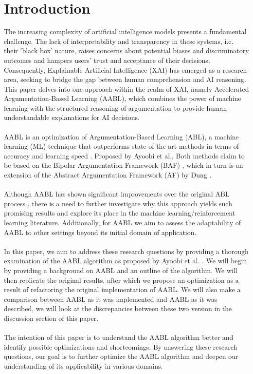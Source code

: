 \documentclass{article}
\begin{document}
\section{Introduction}
The increasing complexity of artificial intelligence models presents a fundamental challenge. The lack of interpretability and transparency in these systems, i.e. their  'black box' nature, raises concerns about potential biases and discriminatory outcomes and hampers users' trust and acceptance of their decisions. Consequently, Explainable Artificial Intelligence (XAI) has emerged as a research area, seeking to bridge the gap between human comprehension and AI reasoning. This paper delves into one approach within the realm of XAI, namely Accelerated Argumentation-Based Learning (AABL), which combines the power of machine learning with the structured reasoning of argumentation to provide human-understandable explanations for AI decisions.
\\\\
AABL is an optimization of Argumentation-Based Learning (ABL), a machine learning (ML) technique that  outperforms state-of-the-art methods in terms of accuracy and learning speed \cite{ayoobi2019handling, ayoobi2021online, valk2020comparing}. Proposed by Ayoobi et al.\cite{ayoobi2021argue}, Both methods claim to be based on the Bipolar Argumentation Framework (BAF) \cite{amgoud2008bipolarity}, which in turn is an extension of the Abstract Argumentation Framework (AF) by Dung \cite{dung1995acceptability}.
\\\\
Although AABL has shown significant improvements over the original ABL process \cite{ayoobi2019handling}, there is a need to further investigate why this approach yields such promising results and explore its place in the machine learning/reinforcement learning literature. Additionally, for AABL we aim to assess the adaptability of AABL to other settings beyond its initial domain of application.
\\\\
 In this paper, we aim to address these research questions by providing a thorough examination of the AABL algorithm as proposed by Ayoobi et al. \cite{ayoobi2021argue}. We will begin by providing a background on AABL and an outline of the algorithm. We will then replicate the original results, after which we propose an optimization as a result of refactoring the original implementation of AABL. We will also make a comparison between AABL as it was implemented and AABL as it was described, we will look at the discrepancies between these two version in the discussion section of this paper. 
\\\\
The intention of this paper is to understand the AABL algorithm better and identify possible optimizations and shortcomings. By answering these research questions, our goal is to further optimize the AABL algorithm and deepen our understanding of its applicability in various domains.
\end{document}
